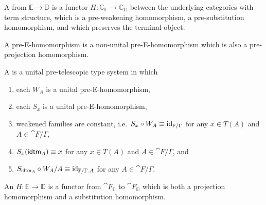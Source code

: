 \begin{defn}
A  from $\mathbb{E}\to\mathbb{D}$ is a functor
$H:\mathbb{C}_\mathbb{E}\to\mathbb{C}_\mathbb{D}$ between the underlying categories
with term structure, which is a pre-weakening homomorphism, a pre-substitution
homomorphism, and which preserves the terminal object. 

A  pre-E-homomorphism is a non-unital pre-E-homomorphism which is 
also a pre-projection homomorphism. 
\end{defn}

\begin{defn}
\label{defn:esystems}
A  is a unital pre-telescopic type system in which 
\begin{enumerate}
\item each $W_A$ is a unital pre-E-homomorphism,
\item each $S_x$ is a unital pre-E-homomorphism,
\item \label{tTf:StWf_id} weakened families are constant, i.e.~$S_x\circ W_A\equiv {\mathrm{id}_{\mathbb{F}/\Gamma}}$ for any $x\in T(A)$ and $A\in\cat{F}/\Gamma$,
\item $S_x(\tfid{A})\jdeq x$ for any $x\in T(A)$ and $A\in\cat{F}/\Gamma$, and
\item \label{f:SidfWff_id} $S_{\tfid{A}}\circ W_A/A\jdeq \catid{\cat{F}/\ctxext{\Gamma}{A}}$ for any $A\in\cat{F}/\Gamma$.
\end{enumerate}
An  $H:\mathbb{E}\to\mathbb{D}$ is a functor from
$\cat{F}_{\mathbb{E}}$ to $\cat{F}_{\mathbb{D}}$ which is both a projection
homomorphism and a substitution homomorphism.
\end{defn}

